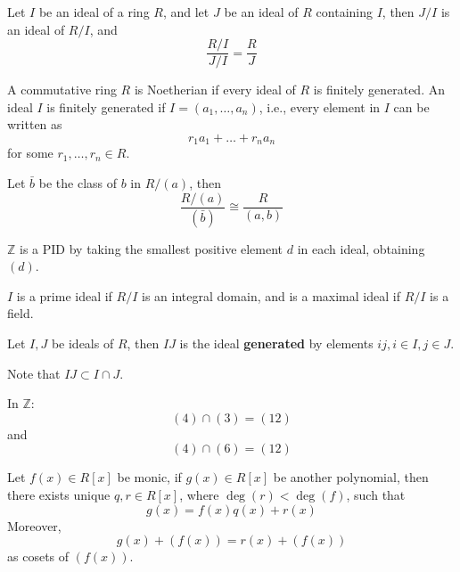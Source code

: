 \documentclass[openany]{book}
\newcommand{\Z}{\mathbb{Z}}
\begin{document}
\begin{prop}
    Let $I$ be an ideal of a ring $R$, and let $J$ be an ideal of $R$ containing $I$, then $J/I$ is an ideal of $R/I$, and 
    \begin{equation*}
        \frac{R/I}{J/I}=\frac{R}{J}
    \end{equation*}
\end{prop}


\begin{defn}[Noetherian]
    A commutative ring $R$ is Noetherian if every ideal of $R$ is finitely generated. An ideal $I$ is finitely generated if $I=(a_1,\dots,a_n)$, i.e., every element in $I$ can be written as 
    \begin{equation*}
        r_1a_1+\dots+r_na_n
    \end{equation*}
    for some $r_1,\dots, r_n\in R$.
\end{defn}

\begin{prop}
    Let $\bar{b}$ be the class of $b$ in $R/(a)$, then 
    \begin{equation*}
        \frac{R/(a)}{(\bar{b})}\cong\frac{R}{(a,b)}
    \end{equation*}
\end{prop}
\begin{prop}
    $\Z$ is a PID by taking the smallest positive element $d$ in each ideal, obtaining $(d)$.
\end{prop}


\begin{defn}
    $I$ is a prime ideal if $R/I$ is an integral domain, and is a maximal ideal if $R/I$ is a field.
\end{defn}
\begin{defn}
    Let $I,J$ be ideals of $R$, then $IJ$ is the ideal \textbf{generated} by elements $ij, i\in I, j\in J$.

    Note that $IJ\subset I\cap J$. 
\end{defn}

\begin{example}
    In $\Z$:
    \begin{equation*}
        (4)\cap(3)=(12)
    \end{equation*}
    and 
    \begin{equation*}
        (4)\cap(6)=(12)
    \end{equation*}
\end{example}
\begin{defn}
    Let $f(x)\in R[x]$ be monic, if $g(x)\in R[x]$ be another polynomial, then there exists unique $q,r\in R[x]$, where $\deg(r)<\deg(f)$, such that 
    \begin{equation*}
        g(x)=f(x)q(x)+r(x)
    \end{equation*}
    Moreover, 
    \begin{equation*}
        g(x)+(f(x))=r(x)+(f(x))
    \end{equation*}
    as cosets of $(f(x))$.
\end{defn}
\end{document}
